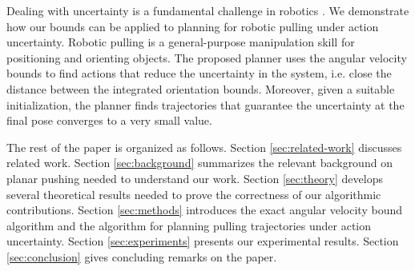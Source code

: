 \documentclass[conference]{IEEEtran}
\begin{document}
Dealing with uncertainty is a fundamental challenge in robotics
\cite{Thrun2005}. We demonstrate how our bounds can be applied to
planning for robotic pulling under action uncertainty. Robotic pulling
is a general-purpose manipulation skill for positioning and orienting
objects. The proposed planner uses the angular velocity bounds to find
actions that reduce the uncertainty in the system, i.e. close the
distance between the integrated orientation bounds. Moreover, given a
suitable initialization, the planner finds trajectories that guarantee
the uncertainty at the final pose converges to a very small value.

The rest of the paper is organized as follows. Section
\ref{sec:related-work} discusses related work. Section
\ref{sec:background} summarizes the relevant background on planar
pushing needed to understand our work. Section \ref{sec:theory}
develops several theoretical results needed to prove the correctness
of our algorithmic contributions. Section \ref{sec:methods} introduces
the exact angular velocity bound algorithm and the algorithm for
planning pulling trajectories under action uncertainty. Section
\ref{sec:experiments} presents our experimental results. Section
\ref{sec:conclusion} gives concluding remarks on the paper.











\end{document}
